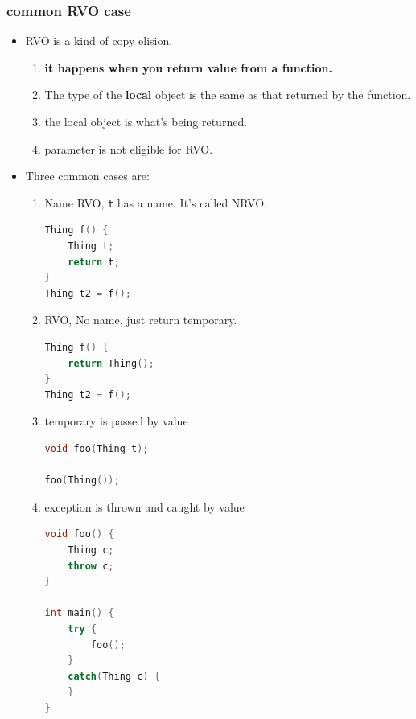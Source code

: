 \documentclass[a4paper,11pt,twoside]{book}
\begin{document}
\subsubsection{common RVO case}
\begin{itemize}
	\item RVO is a kind of copy elision. 
	\begin{enumerate}
		\item \textbf{it happens when you return value from a function.}
		\item The type of the \textbf{local} object is the same as that returned by the function.
		\item the local object is what's being returned.
		\item parameter is not eligible for RVO. 
	\end{enumerate}
	
	\item Three common cases are:
	\begin{enumerate}
		\item Name RVO, \texttt{t} has a name. It's called NRVO.
\begin{lstlisting}[frame=single, language=c++, mathescape=true]
Thing f() {
	Thing t;
	return t;
}
Thing t2 = f();
\end{lstlisting}

		\item RVO, No name, just return temporary.
\begin{lstlisting}[frame=single, language=c++, mathescape=true]
Thing f() {
	return Thing();
}
Thing t2 = f();
\end{lstlisting}

		\item temporary is passed by value
\begin{lstlisting}[frame=single, language=c++, mathescape=true]
void foo(Thing t);

foo(Thing());
\end{lstlisting}

\item exception is thrown and caught by value
\begin{lstlisting}[frame=single, language=c++, mathescape=true]
void foo() {
	Thing c;
	throw c;
}

int main() {
	try {
		foo();
	}
	catch(Thing c) {  
	}             
}
\end{lstlisting}

	\end{enumerate}

\end{itemize}
\end{document}
